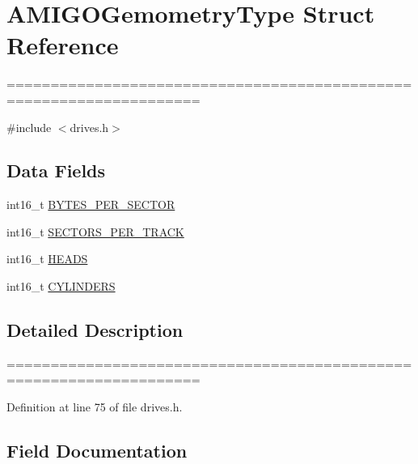 \hypertarget{structAMIGOGemometryType}{}\section{A\+M\+I\+G\+O\+Gemometry\+Type Struct Reference}
\label{structAMIGOGemometryType}


====================================================================  




{\ttfamily \#include $<$drives.\+h$>$}

\subsection*{Data Fields}
\begin{DoxyCompactItemize}
\item 
int16\+\_\+t \hyperlink{structAMIGOGemometryType_a38dc0b559f00c78f30fe0c43c53b582a}{B\+Y\+T\+E\+S\+\_\+\+P\+E\+R\+\_\+\+S\+E\+C\+T\+OR}
\item 
int16\+\_\+t \hyperlink{structAMIGOGemometryType_a9ac647c76bd331ab5b1fd22a4f5b9a4a}{S\+E\+C\+T\+O\+R\+S\+\_\+\+P\+E\+R\+\_\+\+T\+R\+A\+CK}
\item 
int16\+\_\+t \hyperlink{structAMIGOGemometryType_a33131d3948935e2064af9af151653033}{H\+E\+A\+DS}
\item 
int16\+\_\+t \hyperlink{structAMIGOGemometryType_a4282aeb6c4aac3b8cfc09e29402dcd3f}{C\+Y\+L\+I\+N\+D\+E\+RS}
\end{DoxyCompactItemize}


\subsection{Detailed Description}
==================================================================== 

Definition at line 75 of file drives.\+h.



\subsection{Field Documentation}
